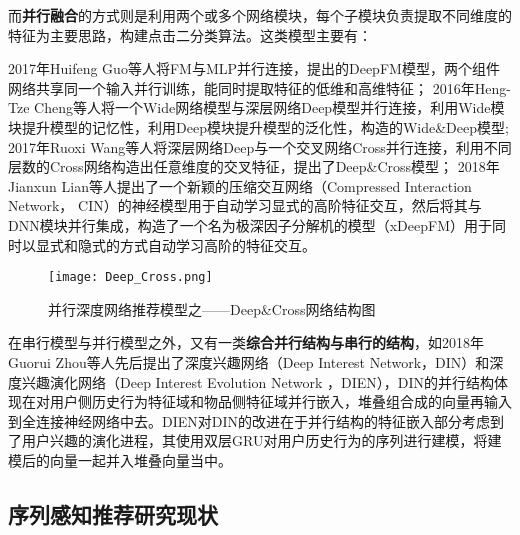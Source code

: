 而\textbf{并行融合}的方式则是利用两个或多个网络模块，每个子模块负责提取不同维度的特征为主要思路，构建点击二分类算法。这类模型主要有：


2017年Huifeng Guo等人将FM与MLP并行连接，提出的DeepFM模型，两个组件网络共享同一个输入并行训练，能同时提取特征的低维和高维特征；
2016年Heng-Tze Cheng等人将一个Wide网络模型与深层网络Deep模型并行连接，利用Wide模块提升模型的记忆性，利用Deep模块提升模型的泛化性，构造的Wide\&Deep模型;
2017年Ruoxi Wang等人将深层网络Deep与一个交叉网络Cross并行连接，利用不同层数的Cross网络构造出任意维度的交叉特征，提出了Deep\&Cross模型；
2018年Jianxun Lian等人提出了一个新颖的压缩交互网络（Compressed Interaction Network， CIN）的神经模型用于自动学习显式的高阶特征交互，然后将其与DNN模块并行集成，构造了一个名为极深因子分解机的模型（xDeepFM）用于同时以显式和隐式的方式自动学习高阶的特征交互。
\begin{figure}[htb]
  \centering
  \texttt{[image: Deep\_Cross.png]}\\
  \caption{并行深度网络推荐模型之——Deep\&Cross网络结构图}
  \label{fig:Deep_Cross}
\end{figure}

在串行模型与并行模型之外，又有一类\textbf{综合并行结构与串行的结构}，如2018年Guorui Zhou等人先后提出了深度兴趣网络（Deep Interest Network，DIN）和深度兴趣演化网络（Deep Interest Evolution Network ，DIEN），DIN的并行结构体现在对用户侧历史行为特征域和物品侧特征域并行嵌入，堆叠组合成的向量再输入到全连接神经网络中去。DIEN对DIN的改进在于并行结构的特征嵌入部分考虑到了用户兴趣的演化进程，其使用双层GRU对用户历史行为的序列进行建模，将建模后的向量一起并入堆叠向量当中。

\subsection{序列感知推荐研究现状}

